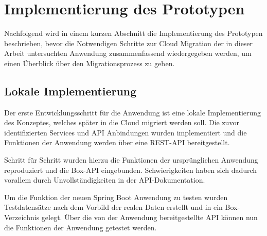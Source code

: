 \chapter{Implementierung des Prototypen}

Nachfolgend wird in einem kurzen Abschnitt die Implementierung des Prototypen beschrieben, bevor die Notwendigen Schritte zur Cloud Migration der in dieser Arbeit untersuchten Anwendung zusammenfassend wiedergegeben werden, um einen Überblick über den Migrationsprozess zu geben.

\section{Lokale Implementierung}
Der erste Entwicklungsschritt für die Anwendung ist eine lokale Implementierung des Konzeptes, welches später in die Cloud migriert werden soll. Die zuvor identifizierten Services und \ac{API} Anbindungen wurden implementiert und die Funktionen der Anwendung werden über eine \ac{REST}-\ac{API} bereitgestellt.

Schritt für Schritt wurden hierzu die Funktionen der ursprünglichen Anwendung reproduziert und die \gls{Box}-\ac{API} eingebunden. Schwierigkeiten haben sich dadurch vorallem durch Unvollständigkeiten in der \ac{API}-Dokumentation.

Um die Funktion der neuen \gls{Spring Boot} Anwendung zu testen wurden Testdatensätze nach dem Vorbild der realen Daten erstellt und in ein \gls{Box}-Verzeichnis gelegt. Über die von der Anwendung bereitgestellte \ac{API} können nun die Funktionen der Anwendung getestet werden. \pagebreak



